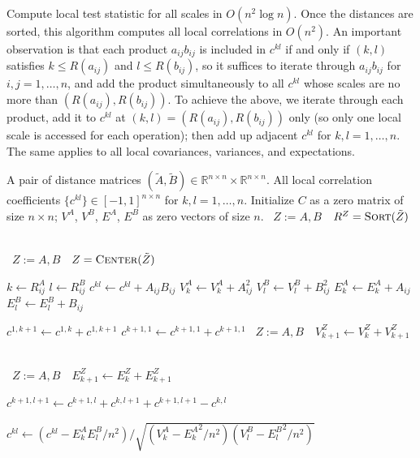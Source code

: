 \documentclass[11pt]{article}
\newcommand{\Real}{\mathbb{R}}
\newcommand{\G}{c}
\newcommand{\Linefor}[2]{%
    \State \algorithmicfor\ {#1}\ \algorithmicdo\ {#2} \algorithmicend\ \algorithmicfor%
}
\newcommand{\rto}{\leftarrow}
\begin{document}
\begin{algorithm}
\caption{Compute local test statistic for all scales in $O(n^2 \log n)$. Once the distances are sorted, this algorithm computes all local correlations in $O(n^2)$. An important observation is that each product $a_{ij}b_{ij}$ is included in $\G^{kl}$ if and only if $(k,l)$ satisfies $k\leq R(a_{ij})$ and $l\leq R(b_{ij})$, so it suffices to iterate through $a_{ij}b_{ij}$ for $i,j=1,\ldots,n$, and add the product simultaneously to all $\G^{kl}$ whose scales are no more than $(R(a_{ij}),R(b_{ij}))$. To achieve the above, we iterate through each product, add it to $\G^{kl}$ at $(k,l)=(R(a_{ij}),R(b_{ij}))$ only (so only one local scale is accessed for each operation); then add up adjacent $\G^{kl}$ for $k,l=1,\ldots,n$. The same applies to all local covariances, variances, and expectations.} %
\label{alg:all_scales}
\begin{algorithmic}[1]
\Require A pair of distance matrices $(\tilde{A},\tilde{B}) \in \Real^{n \times n} \times \Real^{n \times n}$.
\Ensure All local correlation coefficients $\{\G^{kl}\} \in [-1,1]^{n \times n}$ for $k,l=1,\ldots,n$.
\State Initialize $C$ as a zero matrix of size $n \times n$; $V^{A}$, $V^{B}$, $E^{A}$, $E^{B}$ as zero vectors of size $n$.
\Linefor{$Z:=A,B$}{$R^{Z}=\textsc{Sort}(\tilde{Z})$}
\Linefor{$Z:=A,B$}{$Z=\textsc{Center}(\tilde{Z})$}

  
\State $k \rto R^{A}_{ij}$
\State $l \rto R^{B}_{ij}$
\State $\G^{kl} \rto \G^{kl}+A_{ij}B_{ij}$
\State $V^{A}_{k} \rto V^{A}_{k}+A_{ij}^2$
\State $V^{B}_{l} \rto V^{B}_{l}+B_{ij}^2$
\State $E^{A}_{k} \rto E^{A}_{k}+A_{ij}$
\State $E^{B}_{l} \rto E^{B}_{l}+B_{ij}$
\EndFor

  
\State $\G^{1, k+1} \rto \G^{1, k}+\G^{1, k+1}$
\State $\G^{k+1,1} \rto \G^{k+1,1}+\G^{k+1,1}$
\Linefor{$Z:=A,B$}{$V^{Z}_{k+1} \rto V^{Z}_{k}+V^{Z}_{k+1}$}
\Linefor{$Z:=A,B$}{$E^{Z}_{k+1} \rto E^{Z}_{k}+E^{Z}_{k+1}$}
\EndFor

\State $\G^{k+1,l+1} \rto \G^{k+1,l}+\G^{k,l+1}+\G^{k+1,l+1}-\G^{k,l}$
\EndFor

\State $\G^{kl} \rto \left(\G^{kl}-E^{A}_{k}E^{B}_{l}/n^2\right)/\sqrt{\left(V^{A}_{k}-{E^{A}_{k}}^2/n^2\right) \left(V^{B}_{l}-{E^{B}_{l}}^2/n^2\right)}$
\EndFor
\EndFunction
\end{algorithmic}
\end{algorithm}
\end{document}

